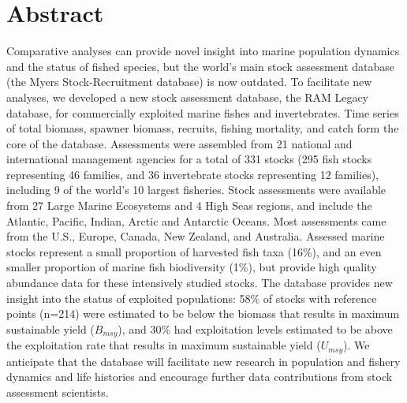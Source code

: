 \section*{Abstract}

Comparative analyses can provide novel insight into marine population dynamics and the status of fished species, but the world's main stock assessment database (the Myers Stock-Recruitment database) is now outdated.  
To facilitate new analyses, we developed a new stock assessment database, the RAM Legacy database, for commercially exploited marine fishes and invertebrates. 
Time series of total biomass, spawner biomass, recruits, fishing mortality, and catch form the core of the database. 
Assessments were assembled from 21 national and international management agencies for a total of 331 stocks (295 fish stocks representing 46 families, and 36 invertebrate stocks representing 12 families), including 9 of the world's 10 largest fisheries. Stock assessments were available from 27 Large Marine Ecosystems and 4 High Seas regions, and include the Atlantic, Pacific, Indian, Arctic and Antarctic Oceans. 
Most assessments came from the U.S., Europe, Canada, New Zealand, and Australia. Assessed marine stocks represent a small proportion of harvested fish taxa (16\%), and an even smaller proportion of marine fish biodiversity (1\%), but provide high quality abundance data for these intensively studied stocks. 
The database provides new insight into the status of exploited populations: 58\% of stocks with reference points (n=214) were estimated to be below the biomass that results in maximum sustainable yield ($B_{msy}$), and 30\% had exploitation levels estimated to be above the exploitation rate that results in maximum sustainable yield ($U_{msy}$).
We anticipate that the database will facilitate new research in population and fishery dynamics and life histories and encourage further data contributions from stock assessment scientists.

